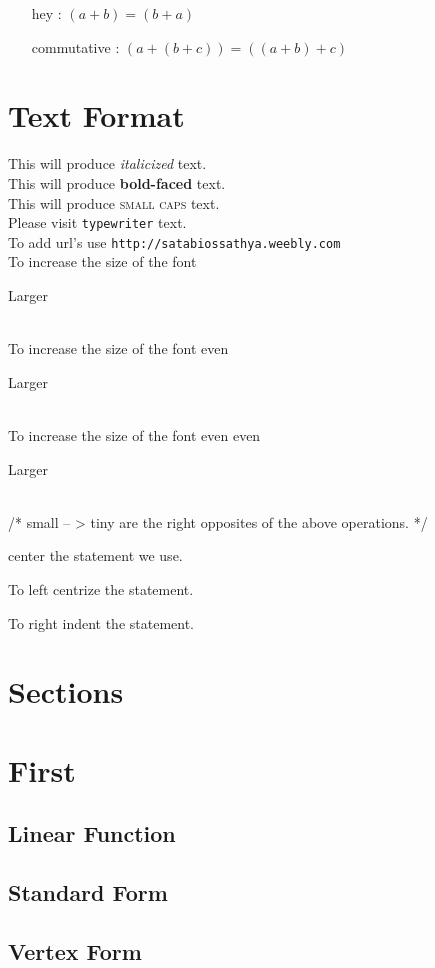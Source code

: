 \documentclass[11pt]{article}
\begin{document}
 
 \begin{enumerate}
  \item [hey :]$(a+b)=(b+a)$
  \item[commutative :] $(a+(b+c))=((a+b)+c)$
 \end{enumerate}

\section{Text Format}
This will produce \textit{italicized} text. \\
This will produce \textbf{bold-faced} text. \\ 
This will produce \textsc{small caps} text. \\
Please visit \texttt{typewriter} text.    \\
To add url's use \texttt{http://satabiossathya.weebly.com} \\
To increase the size of the font \begin{large}Larger \end{large} \\
To increase the size of the font even \begin{Large} Larger \end{Large}     \\
To increase the size of the font even even\begin{huge} Larger \end{huge}  \\

/* small -- > tiny are the right opposites of the above operations. */

\begin{center} 
center the statement we use.  \\
\end{center}

\begin{flushleft}
 To left centrize the statement. \\
\end{flushleft}

\begin{flushright}
 To right indent the statement. \\
\end{flushright}



\section{Sections}
  \section{First}
   \subsection{Linear Function}
     \subsection{Standard Form}
      \subsection{Vertex Form}
\end{document}
